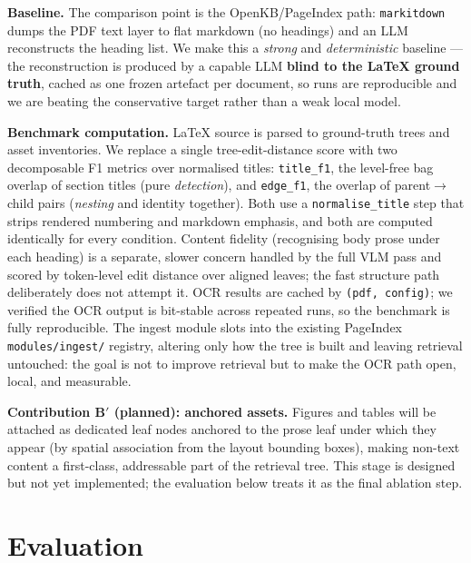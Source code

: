 \documentclass[11pt, a4paper]{article}
\begin{document}
\textbf{Baseline.} The comparison point is the OpenKB/PageIndex path:
\texttt{markitdown} dumps the PDF text layer to flat markdown (no
headings) and an LLM reconstructs the heading list. We make this a
\emph{strong} and \emph{deterministic} baseline --- the reconstruction is
produced by a capable LLM \textbf{blind to the LaTeX ground truth},
cached as one frozen artefact per document, so runs are reproducible and
we are beating the conservative target rather than a weak local model.

\textbf{Benchmark computation.} LaTeX source is parsed to ground-truth
trees and asset inventories. We replace a single tree-edit-distance score
with two decomposable F1 metrics over normalised titles: \texttt{title\_f1},
the level-free bag overlap of section titles (pure \emph{detection}), and
\texttt{edge\_f1}, the overlap of parent$\to$child pairs (\emph{nesting}
and identity together). Both use a \texttt{normalise\_title} step that
strips rendered numbering and markdown emphasis, and both are computed
identically for every condition. Content fidelity (recognising body prose
under each heading) is a separate, slower concern handled by the full VLM
pass and scored by token-level edit distance over aligned leaves; the
fast structure path deliberately does not attempt it. OCR results are
cached by \texttt{(pdf, config)}; we verified the OCR output is
bit-stable across repeated runs, so the benchmark is fully reproducible.
The ingest module slots into the existing PageIndex
\texttt{modules/ingest/} registry, altering only how the tree is built
and leaving retrieval untouched: the goal is not to improve retrieval but
to make the OCR path open, local, and measurable.

\textbf{Contribution B$'$ (planned): anchored assets.} Figures and tables
will be attached as dedicated leaf nodes anchored to the prose leaf under
which they appear (by spatial association from the layout bounding
boxes), making non-text content a first-class, addressable part of the
retrieval tree. This stage is designed but not yet implemented; the
evaluation below treats it as the final ablation step.

\section*{Evaluation}
\end{document}
